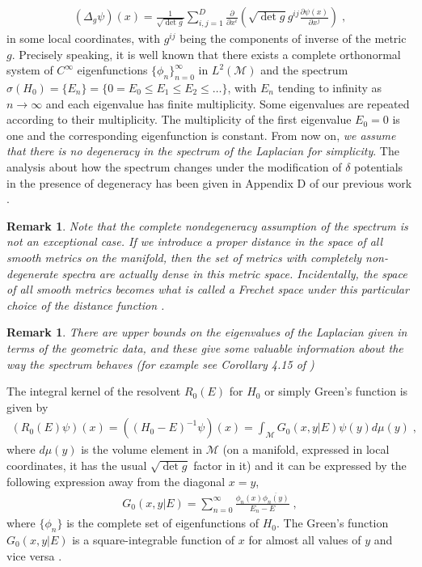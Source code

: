 \documentclass[amsmath,amssymb,14pt]{article}
\numberwithin{equation}{section}
\newtheorem{myremark}[mytheo]{Remark}
\begin{document}
%
\begin{eqnarray}
    (\Delta_g \psi)(x)=  \frac{1}{\sqrt{\det g}} \sum_{i,j=1}^{D} \frac{\partial}{\partial x^i} \left( \sqrt{\det g} g^{ij} \frac{\partial \psi(x)}{\partial x^j}\right)   \;,
\end{eqnarray}
%
in some local coordinates, with $g^{ij}$ being the components of inverse of the metric $g$.
Precisely speaking, it is well known 
\cite{Rosenberg, chavel2} that there exists a complete orthonormal system of $C^\infty$
eigenfunctions $\{\phi_n \}_{n=0}^{\infty}$ in $L^2({\mathcal M})$ and
the spectrum $\sigma(H_0)=\{E_n\} = \{0 = E_0
\leq E_1 \leq E_2 \leq \dots\}$, with $E_n$ tending
to infinity as $n \rightarrow \infty$ and each eigenvalue has
finite multiplicity.
Some eigenvalues are repeated according to their multiplicity. The
multiplicity of the first eigenvalue $E_0=0$ is one and 
the corresponding eigenfunction is constant. From now on, {\it we  assume that there is no degeneracy in the spectrum of the Laplacian for simplicity}. The analysis about how the spectrum changes under the modification of $\delta$ potentials in the presence of degeneracy has been given in Appendix D of our previous work \cite{Annals23}.


\begin{myremark}
Note that the complete nondegeneracy assumption of the spectrum is not an exceptional case. If we introduce  a proper distance in the space of all smooth metrics on the manifold, then the set of metrics with completely non-degenerate spectra are actually dense in this metric space. Incidentally, the space of all smooth metrics becomes what is called a Frechet space under this particular choice of the distance function \cite{Urakawa-thebook}. 
\end{myremark}

\begin{myremark}
  There are upper bounds on the eigenvalues of the Laplacian given in terms of the geometric data, and these give some valuable information about the way the spectrum behaves (for example see Corollary 4.15 of \cite{Urakawa-thebook})
\end{myremark}


%
The integral kernel of the resolvent $R_{0}(E)$ for $H_0$ or simply Green's function is given by
%
\begin{eqnarray}
\left(R_0(E)\psi\right)(x) = \left((H_0-E)^{-1}\psi\right)(x)= \int_{\mathcal{M}} G_0(x,y|E)\psi(y) d\mu(y)   \;,
\end{eqnarray}
%
where $d\mu(y)$ is the volume element in  $\mathcal M$ (on a manifold, expressed in local coordinates, it has the usual $\sqrt{\det g}$ factor in it) and it can be expressed by the following expression away from the diagonal $x=y$,
% 
\begin{eqnarray}
    G_0(x,y|E) = \sum_{n=0}^{\infty} \frac{\phi_n(x) \overline{\phi_n(y)}}{E_n-E}  \;, \label{greenfuncexpansion}
\end{eqnarray}
%
where $\{\phi_n\}$ is the complete set of eigenfunctions of $H_0$. The Green's function $G_0(x,y|E)$ is a square-integrable function of $x$ for almost all values of $y$ and vice versa \cite{ReedSimonv3}. 
\end{document}
